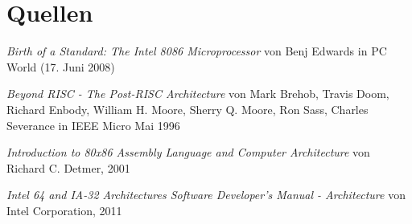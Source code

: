 \section{Quellen}

\begin{thebibliography}{9}

  \emph{Birth of a Standard: The Intel 8086 Microprocessor}
	von Benj Edwards
	in PC World (17. Juni 2008)

	\emph{Beyond RISC - The Post-RISC Architecture}
	von Mark Brehob, Travis Doom, Richard Enbody, William H. Moore, Sherry Q. Moore, Ron Sass, Charles Severance
	in IEEE Micro Mai 1996

	\emph{Introduction to 80x86 Assembly Language and Computer Architecture}
	von Richard C. Detmer,
	2001

	\emph{Intel 64 and IA-32 Architectures Software Developer's Manual - Architecture}
	von Intel Corporation,
	2011
\end{thebibliography}
